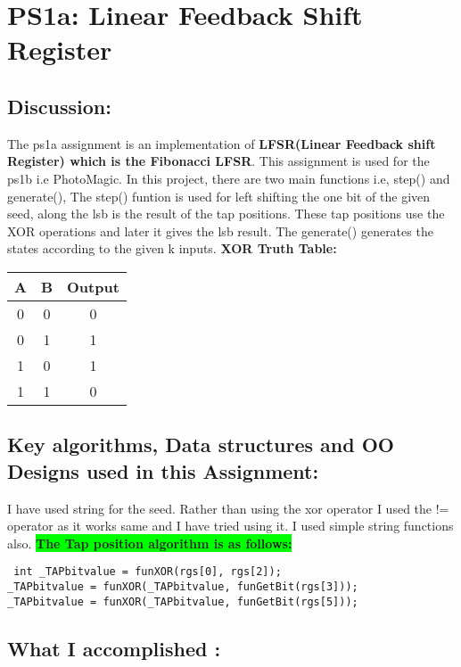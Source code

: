 \section{PS1a: Linear Feedback Shift Register}\label{sec:ps1a}
\graphicspath{{ps1a}}
\subsection{Discussion:}\label{sec:ps1a:disc}
       The ps1a assignment is an implementation of \textbf{LFSR(Linear Feedback shift Register) which is the Fibonacci LFSR}. This assignment is used for the ps1b i.e PhotoMagic. In this project, there are two main functions i.e, step() and generate(), The step() funtion is used for left shifting the one bit of the given seed, along the lsb is the result of the tap positions. These tap positions use the XOR operations and later it gives the lsb result.
    The generate() generates the states according to the given k inputs.\newline
    \textbf{XOR Truth Table:}
    \begin{center}
 \begin{tabular}{||c c c ||} 
 \hline
 A & B & Output \\ [0.5ex] 
 \hline\hline
 0 & 0 & 0 \\ 
 \hline
 0 & 1 & 1 \\
 \hline
 1 & 0 & 1 \\
 \hline
 1 & 1 & 0 \\ [1ex] 
 \hline
\end{tabular}
\end{center}


\subsection{Key algorithms, Data structures and OO Designs used in this Assignment:}\label{sec:ps1a:kdo}
        I have used string for the seed. Rather than using the xor operator I used the != operator as it works same and I have tried using it. I used simple string functions also. \newline
        \textbf{\colorbox{lime}{\textbf{The Tap position algorithm is as follows:}}}
 \begin{lstlisting}
 int _TAPbitvalue = funXOR(rgs[0], rgs[2]);
_TAPbitvalue = funXOR(_TAPbitvalue, funGetBit(rgs[3]));
_TAPbitvalue = funXOR(_TAPbitvalue, funGetBit(rgs[5]));
 \end{lstlisting}

\subsection{What I accomplished :}\label{sec:ps1a:accomplish}


